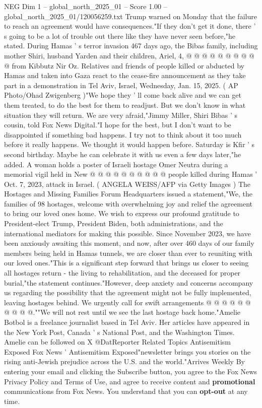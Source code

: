 \begin{textsample}{NEG Dim 1 – global\_north\_2025\_01 – Score 1.00 – global\_north\_2025\_01/120056259.txt}
Trump warned on Monday that the failure to reach an agreement would have consequences."If they don't get it done, there ' s going to be a lot of trouble out there like they have never seen before,"he stated.
During Hamas ' s terror invasion 467 days ago, the Bibas family, including mother Shiri, husband Yarden and their children, Ariel, 4, @ @ @ @ @ @ @ @ @ @ from Kibbutz Nir Oz.
Relatives and friends of people killed or abducted by Hamas and taken into Gaza react to the cease-fire announcement as they take part in a demonstration in Tel Aviv, Israel, Wednesday, Jan. 15, 2025. ( AP Photo/Ohad Zwigenberg )"We hope they ' ll come back alive and we can get them treated, to do the best for them to readjust.
But we don't know in what situation they will return.
We are very afraid,"Jimmy Miller, Shiri Bibas ' s cousin, told Fox News Digital."I hope for the best, but I don't want to be disappointed if something bad happens.
I try not to think about it too much before it really happens.
We thought it would happen before.
Saturday is Kfir ' s second birthday.
Maybe he can celebrate it with us even a few days later,"he added.
A woman holds a poster of Israeli hostage Omer Neutra during a memorial vigil held in New @ @ @ @ @ @ @ @ @ @ people killed during Hamas ' Oct. 7, 2023, attack in Israel. ( ANGELA WEISS/AFP via Getty Images ) The Hostages and Missing Families Forum Headquarters issued a statement,"We, the families of 98 hostages, welcome with overwhelming joy and relief the agreement to bring our loved ones home.
We wish to express our profound gratitude to President-elect Trump, President Biden, both administrations, and the international mediators for making this possible.
Since November 2023, we have been anxiously awaiting this moment, and now, after over 460 days of our family members being held in Hamas tunnels, we are closer than ever to reuniting with our loved ones."This is a significant step forward that brings us closer to seeing all hostages return - the living to rehabilitation, and the deceased for proper burial,"the statement continues."However, deep anxiety and concerns accompany us regarding the possibility that the agreement might not be fully implemented, leaving hostages behind.
We urgently call for swift arrangements @ @ @ @ @ @ @ @ @ @.""We will not rest until we see the last hostage back home."Amelie Botbol is a freelance journalist based in Tel Aviv.
Her articles have appeared in the New York Post, Canada ' s National Post, and the Washington Times.
Amelie can be followed on X @DatReporter Related Topics Antisemitism Exposed Fox News ' Antisemitism Exposed"newsletter brings you stories on the rising anti-Jewish prejudice across the U.S. and the world."Arrives Weekly By entering your email and clicking the Subscribe button, you agree to the Fox News Privacy Policy and Terms of Use, and agree to receive content and \textbf{promotional} communications from Fox News.
You understand that you can \textbf{opt-out} at any time.

\end{textsample}
